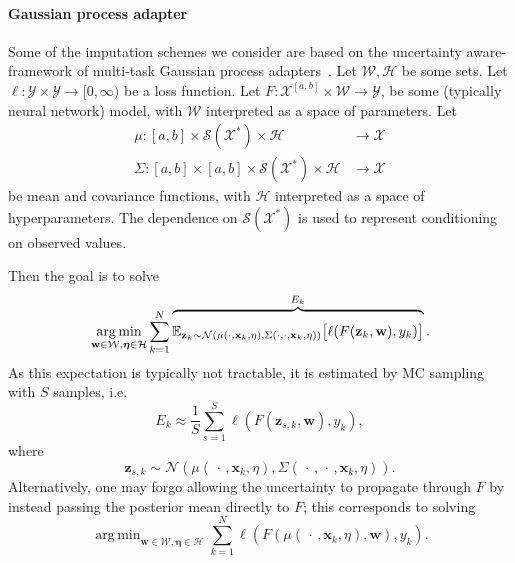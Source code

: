 \documentclass{article}
\DeclareMathOperator*{\argmin}{arg\,min}
\newcommand{\dataspace}{\mathcal{X}}
\newcommand{\lspace}{\mathcal{Y}}
\newcommand{\seriesspace}{\mathcal{S}}
\begin{document}
\paragraph{Gaussian process adapter} \label{sec: GPadapter}
%
Some of the imputation schemes we consider are based on
the uncertainty aware-framework of multi-task Gaussian process
adapters~\citep{li2016scalable, futoma2017mgp}.
%
Let $\mathcal{W}, \mathcal{H}$ be some sets. Let $\ell \colon \lspace
\times \lspace \to [0, \infty)$ be a loss function. Let $F \colon
\dataspace^{[a, b]} \times \mathcal{W} \to \lspace$, be some (typically
neural network) model, with $\mathcal{W}$ interpreted as a space of
parameters. Let \begin{align*} \mu \colon [a, b] \times
\seriesspace(\dataspace^*) \times \mathcal{H} &\to \dataspace\\ \Sigma
\colon [a, b] \times [a, b] \times \seriesspace(\dataspace^*) \times
\mathcal{H} &\to \dataspace    \end{align*} be mean and covariance
functions, with $\mathcal{H}$ interpreted as a space of
hyperparameters. The dependence on $\seriesspace(\dataspace^*)$ is used to
represent conditioning on observed values.

Then the goal is to solve
\begin{equation}\label{eq:gp-mc}
\argmin_{\mathbf{w} \in \mathcal{W},\bm{\eta} \in \mathcal{H}} \sum_{k=1}^N \overbrace{\rule{0pt}{0.5cm} \mathbb{E}_{\mathbf{z}_k \sim \mathcal{N}\left( \mu(\cdot, \mathbf{x}_k, \eta), \Sigma(\cdot, \cdot, \mathbf{x}_k, \eta)\right) } \big[ \ell(F(\mathbf{z}_k, \mathbf{w}),
y_k) \big] }^{\text{$E_k$}}.
\end{equation}
%
As this expectation is typically not tractable, it is estimated by MC
sampling with $S$ samples, i.e.\
%
\begin{equation}
E_k \approx \frac{1}{S} \sum_{s=1}^{S} \ell(F(\mathbf{z}_{s, k}, \mathbf{w}), y_k),
\end{equation}
%
where
\begin{equation}
    \mathbf{z}_{s, k} \sim \mathcal{N}\left( \mu(\,\cdot\,, \mathbf{x}_k, \eta), \Sigma(\,\cdot\,, \,\cdot\,, \mathbf{x}_k, \eta)\right).
\end{equation}
%
Alternatively, one may forgo allowing the uncertainty to propagate through $F$ by instead passing the posterior mean directly to $F$; this corresponds to solving
\begin{equation}\label{eq:gp-mean}
  \argmin_{\mathbf{w} \in \mathcal{W},\bm{\eta} \in \mathcal{H}} \sum_{k=1}^N \ell(F(\mu(\,\cdot\,,\mathbf{x}_k, \eta), \mathbf{w}), y_k).
\end{equation}
\end{document}
